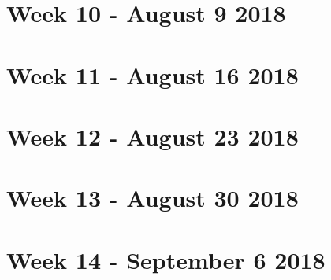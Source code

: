 \documentclass[a4paper]{report}
\begin{document}
\chapter{Week 10 - August 9 2018}


\chapter{Week 11 - August 16 2018}


\chapter{Week 12 - August 23 2018}


\chapter{Week 13 - August 30 2018}

\fi
\chapter{Week 14 - September 6 2018}



\end{document}
